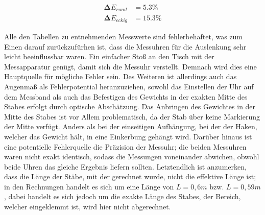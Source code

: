 \begin{align}
    \symbf{\Delta}E_{rund} &= 5.3 \% \\
    \symbf{\Delta}E_{eckig} &= 15.3 \%
\end{align}


\noindent Alle den Tabellen zu entnehmenden Messwerte sind fehlerbehaftet, was zum Einen
darauf zurückzufürhen ist, dass die Messuhren für die Auslenkung sehr leicht
beeinflussbar waren. Ein einfacher Stoß an den Tisch mit der Messapparatur 
genügt, damit sich die Messuhr verstellt. Demnach wird dies eine Hauptquelle
für mögliche Fehler sein. Des Weiteren ist allerdings auch das Augenmaß als 
Fehlerpotential heranzuziehen, sowohl das Einstellen der Uhr auf dem Messband
als auch das Befestigen des Gewichts in der exakten Mitte des Stabes erfolgt
durch optische Abschätzung. Das Anbringen des Gewichtes in der Mitte des 
Stabes ist vor Allem problematisch, da der Stab über keine Markierung der Mitte
verfügt. Anders als bei der einseitigen Aufhängung, bei der der Haken, welcher 
das Gewicht hält, in eine Einkerbung gehängt wird. Darüber hinaus ist eine 
potentielle Fehlerquelle die Präzision der Messuhr; die beiden Messuhren waren
nicht exakt identisch, sodass die Messungen voneinander abwichen, obwohl beide 
Uhren das gleiche Ergebnis liefern sollten. Letztendlich ist anzumerken, dass 
die Länge der Stäbe, mit der gerechnet wurde, nicht die effektive Länge ist;
in den Rechnungen handelt es sich um eine Länge von $L = 0,6m$ bzw. $L = 0,59m$,
dabei handelt es sich jedoch um die exakte Länge des Stabes, der Bereich, welcher
eingeklemmt ist, wird hier nicht abgerechnet.